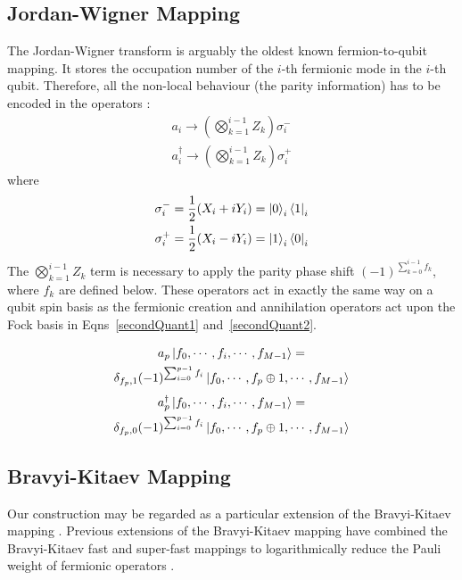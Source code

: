 \documentclass[pdftex,pra,aps,twocolumn,twoside]{revtex4-2}
\theoremstyle{plain}
\theoremstyle{note}
\newcommand\+{{\footnotesize \raisebox{0.3ex}{+}}}
\begin{document}
\subsection{Jordan-Wigner Mapping}
\label{section:jordan-wigner}
The Jordan-Wigner transform \cite{jordan1993paulische} is arguably the oldest known fermion-to-qubit mapping. It stores the occupation number of the $i$-th fermionic mode in the $i$-th qubit. Therefore, all the non-local behaviour (the parity information) has to be encoded in the operators \cite{chiew2021optimal}:
\begin{align}
        a_i \rightarrow \left( \bigotimes_{k=1}^{i-1} Z_k \right) \sigma_i^-\\
        a^{\dagger}_i \rightarrow \left( \bigotimes_{k=1}^{i-1} Z_k \right) \sigma_i^+
\end{align}
where
\begin{align}
        \sigma^-_i = \frac{1}{2} (X_i + i Y_i) = \ket{0}_i \bra{1}_i\\
        \sigma^+_i = \frac{1}{2} (X_i - i Y_i) = \ket{1}_i \bra{0}_i 
\end{align}
The $\bigotimes_{k=1}^{i-1} Z_k$ term is necessary to apply the parity phase shift $(-1)^{\sum_{k=0}^{i-1} f_k}$, where $f_k$ are defined below. These operators act in exactly the same way on a qubit spin basis as the fermionic creation and annihilation operators act upon the Fock basis in Eqns~\eqref{secondQuant1} and~\eqref{secondQuant2}.

\begin{multline}
    \label{secondQuant1}
    a_p \ket{f_0,\cdots, f_i, \cdots, f_{M-1}} =\\ \delta_{f_p, 1} (-1)^{\sum_{i=0}^{p-1} f_i} \ket{f_0,\cdots, f_p \oplus 1, \cdots, f_{M-1}}
    \end{multline}
\begin{multline}
    \label{secondQuant2}
    a_p^{\dagger} \ket{f_0,\cdots, f_i, \cdots, f_{M-1}} =\\ \delta_{f_p, 0} (-1)^{\sum_{i=0}^{p-1} f_i}
    \ket{f_0,\cdots, f_p \oplus 1, \cdots, f_{M-1}}
    \end{multline}
\subsection{Bravyi-Kitaev Mapping}
\label{section:bravyi-kitaev}
Our construction may be regarded as a particular extension of the Bravyi-Kitaev mapping \cite{Bravyi_2002}. Previous extensions of the Bravyi-Kitaev mapping have combined the Bravyi-Kitaev fast and super-fast mappings to logarithmically reduce the Pauli weight of fermionic operators \cite{Setia_2019}.
\end{document}
